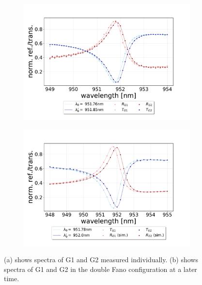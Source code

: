 \begin{figure}[h!]
    \centering
    \begin{subfigure}[b]{0.49\textwidth}
        \includegraphics[width=\textwidth]{figures/results/M3:M5/M3:M5_initial_spectra.pdf}
        \caption{}
        \label{fig:G1_and_G2_initial_discussion}
    \end{subfigure}
    \begin{subfigure}[b]{0.49\textwidth}
        \includegraphics[width=\textwidth]{figures/results/M3:M5/M3:M5_spectra_at_measurement.pdf}
        \caption{}
        \label{fig:G1_and_G2_double_fano_config_discussion}
    \end{subfigure}
    \caption{(a) shows spectra of G1 and G2 measured individually. (b) shows spectra of G1 and G2 in the double Fano configuration at a later time.}
    \label{fig:G1_and_G2_spectra_individual_and_in_double_fano_config}
\end{figure}

